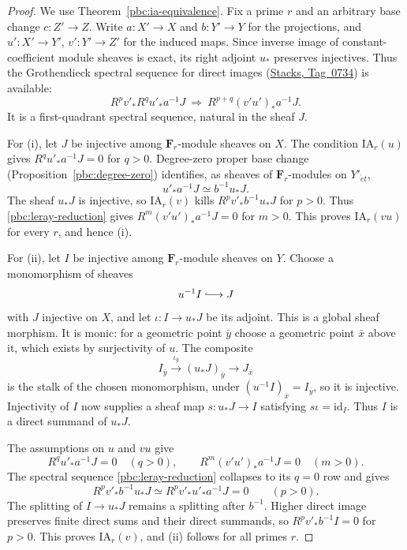 \documentclass[11pt,a4paper]{article}
\numberwithin{equation}{section}
\theoremstyle{definition}
\theoremstyle{remark}
\newcommand{\et}{\acute{e}t}
\newcommand{\stacks}[1]{\href{https://stacks.math.columbia.edu/tag/#1}{\textnormal{Stacks, Tag~#1}}}
\begin{document}
\begin{proof}
We use Theorem~\ref{pbc:ia-equivalence}. Fix a prime $r$ and an
arbitrary base change $c:Z'\to Z$. Write $a:X'\to X$ and $b:Y'\to Y$
for the projections, and $u':X'\to Y'$, $v':Y'\to Z'$ for the induced
maps. Since inverse image of constant-coefficient module sheaves is
exact, its right adjoint $u_*$ preserves injectives. Thus the
Grothendieck spectral sequence for direct images
(\stacks{0734}) is available:
\begin{equation}\label{pbc:leray-reduction}
 R^pv'_*R^qu'_*a^{-1}J
 \ \Longrightarrow\ R^{p+q}(v'u')_*a^{-1}J.
\end{equation}
It is a first-quadrant spectral sequence, natural in the sheaf $J$.

For (i), let $J$ be injective among $\mathbf F_r$-module sheaves on $X$.
The condition $\mathrm{IA}_r(u)$ gives
$R^qu'_*a^{-1}J=0$ for $q>0$. Degree-zero proper base change
(Proposition~\ref{pbc:degree-zero}) identifies, as sheaves of
$\mathbf F_r$-modules on $Y'_{\et}$,
\[
 u'_*a^{-1}J\simeq b^{-1}u_*J.
\]
The sheaf $u_*J$ is injective, so $\mathrm{IA}_r(v)$ kills
$R^pv'_*b^{-1}u_*J$ for $p>0$. Thus
\eqref{pbc:leray-reduction} gives
$R^m(v'u')_*a^{-1}J=0$ for $m>0$. This proves
$\mathrm{IA}_r(vu)$ for every $r$, and hence (i).

For (ii), let $I$ be injective among $\mathbf F_r$-module sheaves on $Y$.
Choose a monomorphism of sheaves
\[
             u^{-1}I\lhook\joinrel\longrightarrow J
\]
with $J$ injective on $X$, and let $\iota:I\to u_*J$ be its adjoint.
This is a global sheaf morphism. It is monic: for a geometric point
$\bar y$ choose a geometric point $\bar x$ above it, which exists by
surjectivity of $u$. The composite
\[
 I_{\bar y}\xrightarrow{\iota_{\bar y}}(u_*J)_{\bar y}
 \longrightarrow J_{\bar x}
\]
is the stalk of the chosen monomorphism, under
$(u^{-1}I)_{\bar x}=I_{\bar y}$, so it is injective.
Injectivity of $I$ now supplies a sheaf map $s:u_*J\to I$ satisfying
$s\iota=\mathrm{id}_I$. Thus $I$ is a direct summand of $u_*J$.

The assumptions on $u$ and $vu$ give
\[
 R^qu'_*a^{-1}J=0\quad(q>0),\qquad
 R^m(v'u')_*a^{-1}J=0\quad(m>0).
\]
The spectral sequence \eqref{pbc:leray-reduction} collapses to its
$q=0$ row and gives
\[
 R^pv'_*b^{-1}u_*J
 \simeq R^pv'_*u'_*a^{-1}J=0\qquad(p>0).
\]
The splitting of $I\to u_*J$ remains a splitting after $b^{-1}$.
Higher direct image preserves finite direct sums and their direct
summands, so $R^pv'_*b^{-1}I=0$ for $p>0$. This proves
$\mathrm{IA}_r(v)$, and (ii) follows for all primes $r$.
\end{proof}
\end{document}
